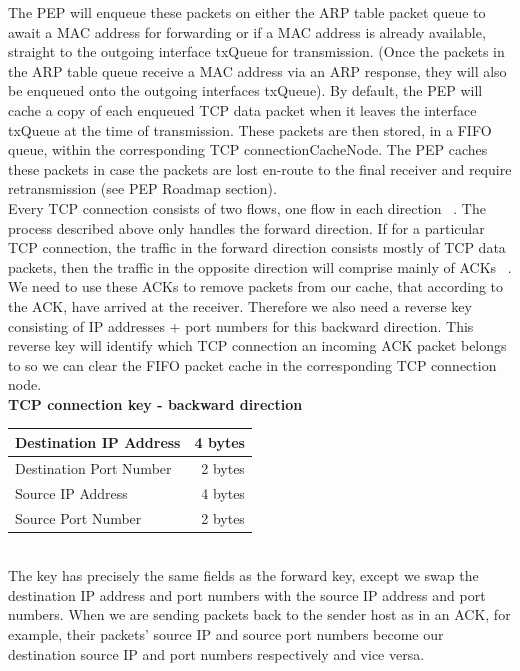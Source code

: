 The PEP will enqueue these packets on either the ARP table packet queue to await a MAC address for forwarding or if a MAC address is already available, straight to the outgoing interface txQueue for transmission. (Once the packets in the ARP table queue receive a MAC address via an ARP response, they will also be enqueued onto the outgoing interfaces txQueue). By default, the PEP will cache a copy of each enqueued TCP data packet when it leaves the interface txQueue at the time of transmission. These packets are then stored, in a FIFO queue, within the corresponding TCP connectionCacheNode. The PEP  caches these packets in case the packets are lost en-route to the final receiver and require retransmission (see PEP Roadmap section).\\

Every TCP connection consists of two flows, one flow in each direction ~\cite{1}. The process described above only handles the forward direction. If for a particular TCP connection, the traffic in the forward direction consists mostly of TCP data packets, then the traffic in the opposite direction will comprise mainly of ACKs ~\cite{1}. We need to use these ACKs to remove packets from our cache, that according to the ACK, have arrived at the receiver. Therefore we also need a reverse key consisting of IP addresses + port numbers for this backward direction. This reverse key will identify which TCP connection an incoming ACK packet belongs to so we can clear the FIFO packet cache in the corresponding TCP connection node. \\

\textbf{TCP connection key - backward direction} \\

\begin{tabular}{|l|r|}
	\hline
    Destination IP Address & 4 bytes\\
	\hline
    Destination Port Number & 2 bytes\\
    \hline 
    Source IP Address & 4 bytes\\
	\hline
    Source Port Number & 2 bytes\\
	\hline
\end{tabular} \\

The key has precisely the same fields as the forward key, except we swap the destination IP address and port numbers with the source IP address and port numbers. When we are sending packets back to the sender host as in an ACK, for example, their packets' source IP and source port numbers become our destination source IP and port numbers respectively and vice versa. \\

